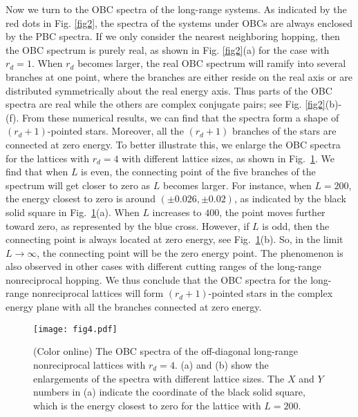 \documentclass[prb,aps,twocolumn,showpacs]{revtex4-2} %
\begin{document}
Now we turn to the OBC spectra of the long-range systems. As indicated by the red dots in Fig. \ref{fig2}, the spectra of the systems under OBCs are always enclosed by the PBC spectra. If we only consider the nearest neighboring hopping, then the OBC spectrum is purely real, as shown in Fig. \ref{fig2}(a) for the case with $r_d=1$. When $r_d$ becomes larger, the real OBC spectrum will ramify into several branches at one point, where the branches are either reside on the real axis or are distributed symmetrically about the real energy axis. Thus parts of the OBC spectra are real while the others are complex conjugate pairs; see Fig. \ref{fig2}(b)-(f). From these numerical results, we can find that the spectra form a shape of $(r_d+1)$-pointed stars. Moreover, all the $(r_d+1)$ branches of the stars are connected at zero energy. To better illustrate this, we enlarge the OBC spectra for the lattices with $r_d=4$ with different lattice sizes, as shown in Fig.~\ref{fig4}. We find that when $L$ is even, the connecting point of the five branches of the spectrum will get closer to zero as $L$ becomes larger. For instance, when $L=200$, the energy closest to zero is around $(\pm0.026,\pm0.02)$, as indicated by the black solid square in Fig.~\ref{fig4}(a). When $L$ increases to $400$, the point moves further toward zero, as represented by the blue cross. However, if $L$ is odd, then the connecting point is always located at zero energy, see Fig.~\ref{fig4}(b). So, in the limit $L\rightarrow \infty$, the connecting point will be the zero energy point. The phenomenon is also observed in other cases with different cutting ranges of the long-range nonreciprocal hopping. We thus conclude that the OBC spectra for the long-range nonreciprocal lattices will form $(r_d+1)$-pointed stars in the complex energy plane with all the branches connected at zero energy. 

\begin{figure}[t]
  \texttt{[image: fig4.pdf]}
  \caption{(Color online) The OBC spectra of the off-diagonal long-range nonreciprocal lattices with $r_d=4$. (a) and (b) show the enlargements of the spectra with different lattice sizes. The $X$ and $Y$ numbers in (a) indicate the coordinate of the black solid square, which is the energy closest to zero for the lattice with $L=200$.}
\label{fig4}
\end{figure}
\end{document}
